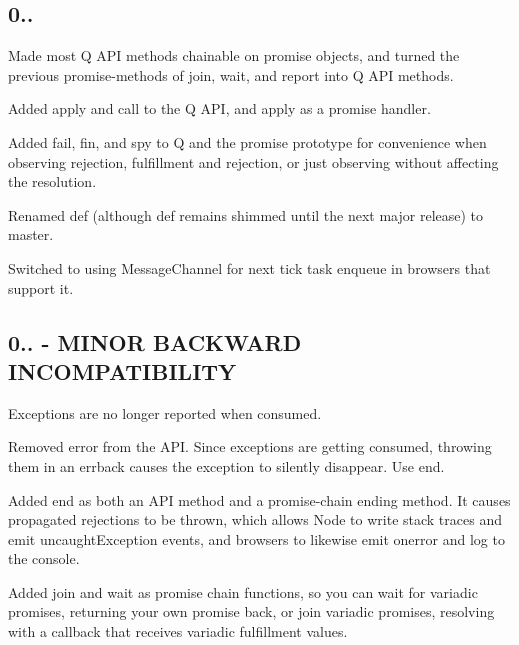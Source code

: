 \subsection*{0..}


\begin{DoxyItemize}
\item Made most Q A\+PI methods chainable on promise objects, and turned the previous promise-\/methods of {\ttfamily join}, {\ttfamily wait}, and {\ttfamily report} into Q A\+PI methods.
\item Added {\ttfamily apply} and {\ttfamily call} to the Q A\+PI, and {\ttfamily apply} as a promise handler.
\item Added {\ttfamily fail}, {\ttfamily fin}, and {\ttfamily spy} to Q and the promise prototype for convenience when observing rejection, fulfillment and rejection, or just observing without affecting the resolution.
\item Renamed {\ttfamily def} (although {\ttfamily def} remains shimmed until the next major release) to {\ttfamily master}.
\item Switched to using {\ttfamily Message\+Channel} for next tick task enqueue in browsers that support it.
\end{DoxyItemize}

\subsection*{0.. -\/ M\+I\+N\+OR B\+A\+C\+K\+W\+A\+RD I\+N\+C\+O\+M\+P\+A\+T\+I\+B\+I\+L\+I\+TY}


\begin{DoxyItemize}
\item Exceptions are no longer reported when consumed.
\item Removed {\ttfamily error} from the A\+PI. Since exceptions are getting consumed, throwing them in an errback causes the exception to silently disappear. Use {\ttfamily end}.
\item Added {\ttfamily end} as both an A\+PI method and a promise-\/chain ending method. It causes propagated rejections to be thrown, which allows Node to write stack traces and emit {\ttfamily uncaught\+Exception} events, and browsers to likewise emit {\ttfamily onerror} and log to the console.
\item Added {\ttfamily join} and {\ttfamily wait} as promise chain functions, so you can wait for variadic promises, returning your own promise back, or join variadic promises, resolving with a callback that receives variadic fulfillment values.
\end{DoxyItemize}

